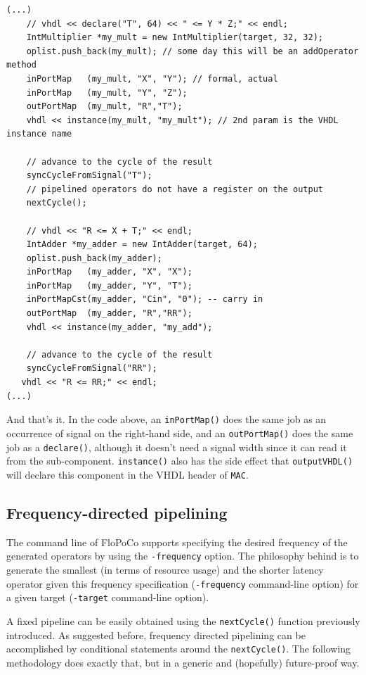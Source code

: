 \documentclass{article}
\begin{document}
\begin{verbatim}
(...)
	// vhdl << declare("T", 64) << " <= Y * Z;" << endl;
	IntMultiplier *my_mult = new IntMultiplier(target, 32, 32);
	oplist.push_back(my_mult); // some day this will be an addOperator method
	inPortMap   (my_mult, "X", "Y"); // formal, actual
	inPortMap   (my_mult, "Y", "Z");
	outPortMap  (my_mult, "R","T");
	vhdl << instance(my_mult, "my_mult"); // 2nd param is the VHDL instance name

	// advance to the cycle of the result
	syncCycleFromSignal("T"); 
	// pipelined operators do not have a register on the output 
	nextCycle();

	// vhdl << "R <= X + T;" << endl;
	IntAdder *my_adder = new IntAdder(target, 64);
	oplist.push_back(my_adder);
	inPortMap   (my_adder, "X", "X");
	inPortMap   (my_adder, "Y", "T");
	inPortMapCst(my_adder, "Cin", "0"); -- carry in
	outPortMap  (my_adder, "R","RR");
	vhdl << instance(my_adder, "my_add");

	// advance to the cycle of the result
	syncCycleFromSignal("RR"); 
   vhdl << "R <= RR;" << endl; 
(...)
\end{verbatim}


And that's it. In the code above, an \verb!inPortMap()! does the same
job as an occurrence of signal on the right-hand side, and an
\verb!outPortMap()! does the same job as a \verb!declare()!, although
it doesn't need a signal width since it can read it from the
sub-component. \verb!instance()! also has the side effect that
\verb!outputVHDL()! will declare this component in the VHDL header of
\verb!MAC!.


\subsection{Frequency-directed pipelining}
\label{sec:finegrain}

The command line of FloPoCo supports specifying the desired frequency
of the generated operators by using the \verb!-frequency! option. The
philosophy behind is to generate the smallest (in terms of resource
usage) and the shorter latency operator given this frequency
specification (\texttt{-frequency} command-line option) for a given
target (\texttt{-target} command-line option).

A fixed pipeline can be easily obtained using the
\verb!nextCycle()! function previously introduced. As suggested before, frequency
directed pipelining can be accomplished by  conditional statements around the 
\verb!nextCycle()!. The following methodology does 
exactly that, but in a generic and (hopefully) future-proof way. 
\end{document}
